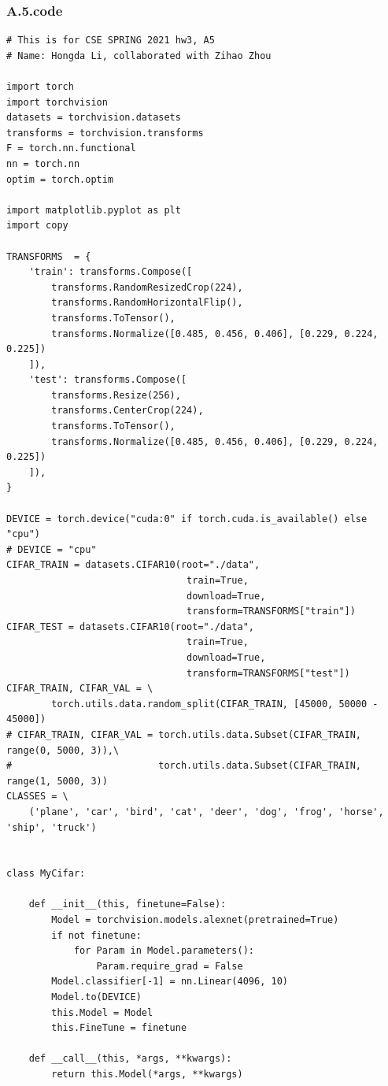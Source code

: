 \documentclass[]{article}
\begin{document}
    \subsubsection*{A.5.code}
        \begin{lstlisting}
# This is for CSE SPRING 2021 hw3, A5
# Name: Hongda Li, collaborated with Zihao Zhou

import torch
import torchvision
datasets = torchvision.datasets
transforms = torchvision.transforms
F = torch.nn.functional
nn = torch.nn
optim = torch.optim

import matplotlib.pyplot as plt
import copy

TRANSFORMS  = {
    'train': transforms.Compose([
        transforms.RandomResizedCrop(224),
        transforms.RandomHorizontalFlip(),
        transforms.ToTensor(),
        transforms.Normalize([0.485, 0.456, 0.406], [0.229, 0.224, 0.225])
    ]),
    'test': transforms.Compose([
        transforms.Resize(256),
        transforms.CenterCrop(224),
        transforms.ToTensor(),
        transforms.Normalize([0.485, 0.456, 0.406], [0.229, 0.224, 0.225])
    ]),
}

DEVICE = torch.device("cuda:0" if torch.cuda.is_available() else "cpu")
# DEVICE = "cpu"
CIFAR_TRAIN = datasets.CIFAR10(root="./data",
                                train=True,
                                download=True,
                                transform=TRANSFORMS["train"])
CIFAR_TEST = datasets.CIFAR10(root="./data",
                                train=True,
                                download=True,
                                transform=TRANSFORMS["test"])
CIFAR_TRAIN, CIFAR_VAL = \
        torch.utils.data.random_split(CIFAR_TRAIN, [45000, 50000 - 45000])
# CIFAR_TRAIN, CIFAR_VAL = torch.utils.data.Subset(CIFAR_TRAIN, range(0, 5000, 3)),\
#                          torch.utils.data.Subset(CIFAR_TRAIN, range(1, 5000, 3))
CLASSES = \
    ('plane', 'car', 'bird', 'cat', 'deer', 'dog', 'frog', 'horse', 'ship', 'truck')


class MyCifar:

    def __init__(this, finetune=False):
        Model = torchvision.models.alexnet(pretrained=True)
        if not finetune:
            for Param in Model.parameters():
                Param.require_grad = False
        Model.classifier[-1] = nn.Linear(4096, 10)
        Model.to(DEVICE)
        this.Model = Model
        this.FineTune = finetune

    def __call__(this, *args, **kwargs):
        return this.Model(*args, **kwargs)


\end{lstlisting}
\end{document}
